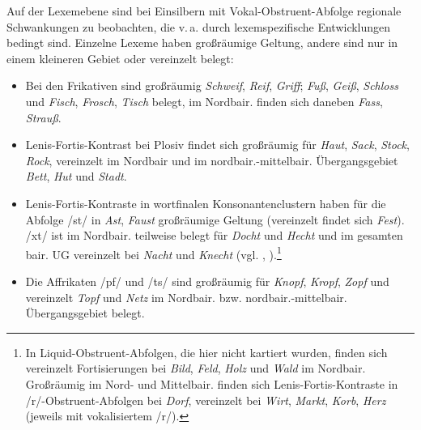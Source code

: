 Auf der Lexemebene sind bei Einsilbern mit Vokal-Obstruent-Abfolge regionale Schwankungen zu beobachten, die v.\,a. durch lexemspezifische Entwicklungen bedingt sind. Einzelne Lexeme haben großräumige Geltung, andere sind nur in einem kleineren Gebiet oder vereinzelt belegt:

\begin{itemize}\sloppy
\item Bei den Frikativen sind großräumig \textit{Schweif}, \textit{Reif}, \textit{Griff}; \textit{Fuß}, \textit{Geiß}, \textit{Schloss} und \textit{Fisch}, \textit{Frosch}, \textit{Tisch} belegt, im Nordbair. finden sich daneben \textit{Fass}, \textit{Strauß}.
\item Lenis-Fortis-Kontrast bei Plosiv findet sich großräumig für \textit{Haut}, \textit{Sack}, \textit{Stock}, \textit{Rock}, vereinzelt im Nordbair und im nordbair.-mittelbair. Übergangsgebiet \textit{Bett}, \textit{Hut} und \textit{Stadt}.
\item Lenis-Fortis-Kontraste in wortfinalen Konsonantenclustern haben für die Abfolge /st/ in \textit{Ast}, \textit{Faust} großräumige Geltung (vereinzelt findet sich \textit{Fest}). /xt/ ist im Nordbair. teilweise belegt für \textit{Docht} und \textit{Hecht} und im gesamten bair. UG vereinzelt bei \textit{Nacht} und \textit{Knecht} (vgl. \citealt[33]{Hinderling1980}, \citealt[119]{Seiler2005}).\footnote{In Liquid-Obstruent-Abfolgen, die hier nicht kartiert wurden, finden sich vereinzelt Fortisierungen bei \textit{Bild}, \textit{Feld}, \textit{Holz} und \textit{Wald} im Nordbair. Großräumig im Nord- und Mittelbair. finden sich Lenis-Fortis-Kontraste in /r/-Obstruent-Abfolgen bei \textit{Dorf}, vereinzelt bei \textit{Wirt}, \textit{Markt}, \textit{Korb}, \textit{Herz} (jeweils mit vokalisiertem /r/).}
\item Die Affrikaten /pf/ und /ts/ sind großräumig für \textit{Knopf}, \textit{Kropf}, \textit{Zopf} und vereinzelt \textit{Topf} und \textit{Netz} im Nordbair. bzw. nordbair.-mittelbair. Übergangsgebiet belegt.
\end{itemize}

